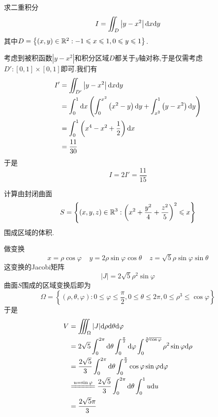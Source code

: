 \documentclass{ctexart}
\begin{document}
\begin{problem}[2.(12\songti{分})]
    求二重积分
    \[I=\iint_{D}\left|y-x^2\right|\mathrm{d} x\mathrm{d} y\]
    其中$D=\left\{(x,y)\in\mathbb{R}^2:-1\leqslant x\leqslant1,0\leqslant y\leqslant1\right\}$.

\end{problem}
\begin{solution}
    考虑到被积函数$\left|y-x^2\right|$和积分区域$D$都关于$y$轴对称,于是仅需考虑$D':[0,1]\times[0,1]$即可.我们有
    \[\begin{aligned}
        I'
        &= \iint_{D'}\left|y-x^2\right|\mathrm{d} x\mathrm{d} y \\
        &= \int_0^1\mathrm{d} x\left(\int_0^{x^2}\left(x^2-y\right)\mathrm{d} y+\int_{x^2}^1\left(y-x^2\right)\mathrm{d} y\right) \\
        &= \int_0^1\left(x^4-x^2+\dfrac12\right)\mathrm{d} x \\
        &= \dfrac{11}{30}
    \end{aligned}\]
    于是
    \[I=2I'=\dfrac{11}{15}\]

\end{solution}
\begin{problem}[3.(12\songti{分})]
    计算由封闭曲面
    \[S=\left\{(x,y,z)\in\mathbb{R}^3:\left(x^2+\dfrac{y^2}{4}+\dfrac{z^2}{5}\right)^2\leqslant x\right\}\]
    围成区域的体积.

\end{problem}
\begin{solution}
    做变换
    \[x=\rho\cos\varphi\ \ \ \ \ y=2\rho\sin\varphi\cos\theta\ \ \ \ \ z=\sqrt{5}\rho\sin\varphi\sin\theta\]
    这变换的Jacobi矩阵
    \[|J|=2\sqrt{5}\rho^2\sin\varphi\]
    曲面$S$围成的区域变换后即为
    \[\Omega=\left\{(\rho,\theta,\varphi):0\leqslant\varphi\leqslant\dfrac\pi2,0\leqslant\theta\leqslant2\pi,0\leqslant\rho^3\leqslant\cos\varphi\right\}\]
    于是
    \[\begin{aligned}
        V
        &= \iiint_{\Omega}|J|\di\rho\di\theta\di\varphi \\
        &= 2\sqrt{5}\int_0^{2\pi}\di\theta\int_0^{\frac\pi2}\di\varphi\int_0^{\sqrt[3]{\cos\varphi}}\rho^2\sin\varphi\di\rho \\
        &= \dfrac{2\sqrt{5}}{3}\int_0^{2\pi}\di\theta\int_0^{\frac\pi2}\cos\varphi\sin\varphi\di\varphi \\
        &\xlongequal{u=\sin\varphi} \dfrac{2\sqrt5}{3}\int_0^{2\pi}\di\theta\int_0^1u\di u \\
        &= \dfrac{2\sqrt5\pi}{3}
    \end{aligned}\]

\end{solution}
\end{document}
